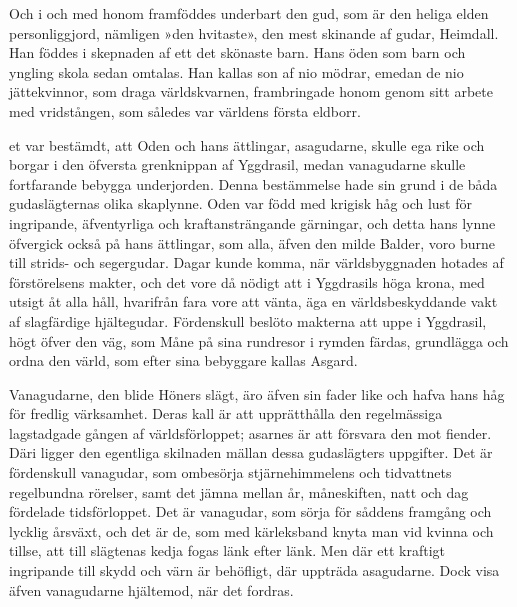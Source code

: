 Och i och med honom framföddes underbart den gud, som är den heliga
elden personliggjord, nämligen »den hvitaste», den mest skinande af
gudar, Heimdall. Han föddes i skepnaden af ett det skönaste barn. Hans
öden som barn och yngling skola sedan omtalas. Han kallas son af nio
mödrar, emedan de nio jättekvinnor, som draga världskvarnen,
frambringade honom genom sitt arbete med vridstången, som således var
världens första eldborr.


\endSecII


\dropcapD et var bestämdt, att Oden och hans ättlingar, asagudarne, skulle ega
rike och borgar i den öfversta grenknippan af Yggdrasil, medan
vanagudarne skulle fortfarande bebygga underjorden. Denna bestämmelse
hade sin grund i de båda gudaslägternas olika skaplynne. Oden var född
med krigisk håg och lust för ingripande, äfventyrliga och
kraftansträngande gärningar, och detta hans lynne öfvergick också på
hans ättlingar, som alla, äfven den milde Balder, voro burne till
strids- och segergudar. Dagar kunde komma, när världsbyggnaden hotades
af förstörelsens makter, och det vore då nödigt att i Yggdrasils höga
krona, med utsigt åt alla håll, hvarifrån fara vore att vänta, äga en
världsbeskyddande vakt af slagfärdige hjältegudar. Fördenskull beslöto
makterna att uppe i Yggdrasil, högt öfver den väg, som Måne på sina
rundresor i rymden färdas, grundlägga och ordna den värld, som efter
sina bebyggare kallas Asgard.

Vanagudarne, den blide Höners slägt, äro äfven sin fader like och hafva
hans håg för fredlig värksamhet. Deras kall är att upprätthålla den
regelmässiga lagstadgade gången af världsförloppet; asarnes är att
försvara den mot fiender. Däri ligger den egentliga skilnaden mällan
dessa gudaslägters uppgifter. Det är fördenskull vanagudar, som
ombesörja stjärnehimmelens och tidvattnets regelbundna rörelser, samt
det jämna mellan år, måneskiften, natt och dag fördelade tidsförloppet.
Det är vanagudar, som sörja för såddens framgång och lycklig årsväxt,
och det är de, som med kärleksband knyta man vid kvinna och tillse, att
till slägtenas kedja fogas länk efter länk. Men där ett kraftigt
ingripande till skydd och värn är behöfligt, där uppträda asagudarne.
Dock visa äfven vanagudarne hjältemod, när det fordras.

